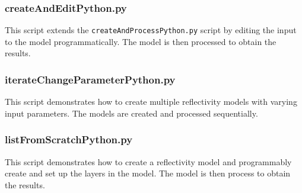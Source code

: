 \subsubsection{createAndEditPython.py} 

This script extends the
\texttt{createAndProcessPython.py} script by editing the input to the model
programmatically. The model is then processed to obtain the results.



\subsubsection{iterateChangeParameterPython.py} 
This script demonstrates how to create
multiple reflectivity models with varying input parameters. The models are created
and processed sequentially.



\subsubsection{listFromScratchPython.py} 
This script demonstrates how to create a
reflectivity model and programmably create and set up the layers in the model.
The model is then process to obtain the results.


